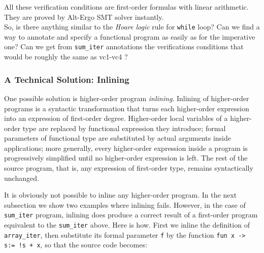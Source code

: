 \documentclass[a4paper,11pt,oneside]{article}
\theoremstyle{plain}
\begin{document}
	All these verification conditions are first-order formulas with linear arithmetic. 
	They are proved by Alt-Ergo SMT solver instantly. \\
	
	So, is there anything similar to the \textit{Hoare logic} rule for \texttt{while} loop?
	Can we find a way to annotate and specify a functional program as easily as for the imperative one? 
	Can we get from \texttt{sum\_iter} annotations the verifications conditions that would be roughly the same as vc1-vc4 ?
	
\subsubsection*{A Technical Solution: Inlining}
	\qquad One possible solution is higher-order program \textit{inlining}.
	Inlining of higher-order programs is a syntactic transformation that turns
each higher-order expression into an expression of first-order degree. 
	Higher-order local variables of a higher-order type are replaced by functional expression they introduce; 
	formal parameters of functional type are substituted by actual arguments inside applications; 
	more generally, every higher-order expression inside a program is progressively simplified until no higher-order expression is left. 
	The rest of the source program, that is, any expression of first-order
type, remains syntactically unchanged. 

	It is obviously not possible to inline any higher-order program. 
	In the next subsection we show two examples where inlining fails. 
	However, in the case of \texttt{sum\_iter} program, inlining does produce a correct result of a first-order program equivalent to the \texttt{sum\_iter} above.
	Here is how. 
	First we inline the definition of \texttt{array\_iter}, then substitute its formal parameter \texttt{f} by the function \texttt{fun x -> s:= !s + x}, so that the source code becomes:
\end{document}
